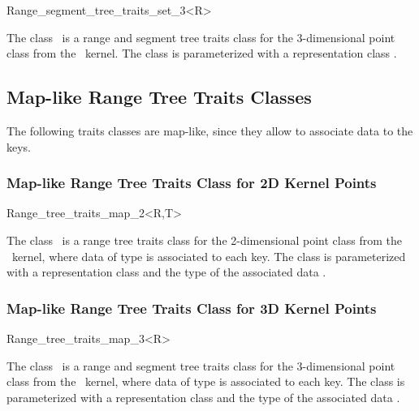 \begin{ccClassTemplate} {Range_segment_tree_traits_set_3<R>}

\ccDefinition
The class \ccClassName\ is a range and segment tree traits class for the 3-dimensional
point class from the \cgal\ kernel.
The class is parameterized with a representation class .


\ccTypes
{}


\end{ccClassTemplate} 


\subsection{Map-like Range Tree Traits Classes}
The following traits classes are map-like, since they allow to
associate data to the keys.


\subsubsection{Map-like Range Tree Traits Class for 2D Kernel Points}

\begin{ccClassTemplate} {Range_tree_traits_map_2<R,T>}

\ccDefinition
The class \ccClassName\ is a range tree traits class for the
2-dimensional point class from the \cgal\ kernel, where data of
type  is associated to each key. The class is
parameterized with a representation class  and the type of
the associated data .


\ccTypes
{}


\end{ccClassTemplate} 

\subsubsection{Map-like Range Tree Traits Class for 3D Kernel Points}

\begin{ccClassTemplate} {Range_tree_traits_map_3<R>}

\ccDefinition
The class \ccClassName\ is a range and segment tree traits class for the 3-dimensional
point class from the \cgal\ kernel,  where data of
type  is associated to each key.
The class is parameterized with a representation class  and the type of
the associated data .


\ccTypes
{}


\end{ccClassTemplate} 

